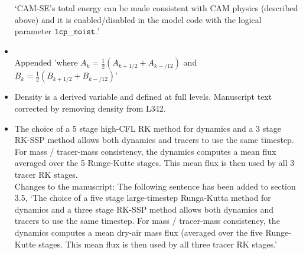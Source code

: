 \documentclass[11pt]{article}
\begin{document}
\begin{itemize}
`CAM-SE's total energy can be made consistent with CAM physics (described above) and it is enabled/disabled in the model code with the  logical parameter $\tt{lcp\_moist}$.'

\item {\color{blue}{L.333: ``... and similarly for full levels k. ... ``: Please specify how $A_k$ and $B_k$ are defined for full levels.}}\\

Appended 'where $A_k=\frac{1}{2}\left( A_{k+1/2}+A_{k-/12}\right)$ and $B_k=\frac{1}{2}\left( B_{k+1/2}+B_{k-/12}\right)$'\\

\item {\color{blue}{L.342: ``... and density ...'': Later Eq.73 shows that density is defined on the full levels, not on the interface levels as stated on this line. What is correct?}}

Density is a derived variable and defined at full levels. Manuscript text corrected by removing density from L342.

\item {\color{blue}{Section ``3.5 Temporal discretization'':
This section details the rational for using different time stepping schemes for different equations or operations. What is missing is to point out if there exist any links between the schemes. In particular I am wondering how tracer mass conservation and mass-wind consistency is achieved with different schemes for advection and the continuity equation. Does the ``faster'' dynamics provide dry-air mass flux information from its se\_rsplit dynamics steps to the ``slower'' tracer advection step?}}

The choice of a 5 stage high-CFL RK method for dynamics and a 3 stage RK-SSP method
allows both dynamics and tracers to use the same timestep.  
For mass / tracer-mass consistency, the dynamics computes a mean flux averaged over
the 5 Runge-Kutte stages.  This mean flux is then used by all 3 tracer RK stages.\\

Changes to the manuscript: The following sentence has been added to section 3.5, `The choice of a five stage large-timestep Runga-Kutta method for dynamics and a three stage RK-SSP method allows both dynamics and tracers to use the same timestep. For mass / tracer-mass consistency, the dynamics computes a mean dry-air mass flux (averaged over the five Runge-Kutte stages. This mean flux is then used by all three tracer RK stages.'


\end{itemize}
\end{document}
